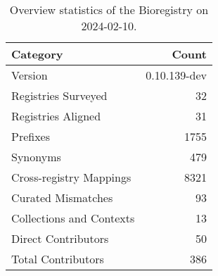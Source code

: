 \begin{table}
\caption{Overview statistics of the Bioregistry on 2024-02-10.}
\label{tab:bioregistry-summary}
\begin{tabular}{lr}
\toprule
Category & Count \\
\midrule
Version & 0.10.139-dev \\
Registries Surveyed & 32 \\
Registries Aligned & 31 \\
Prefixes & 1755 \\
Synonyms & 479 \\
Cross-registry Mappings & 8321 \\
Curated Mismatches & 93 \\
Collections and Contexts & 13 \\
Direct Contributors & 50 \\
Total Contributors & 386 \\
\bottomrule
\end{tabular}
\end{table}
